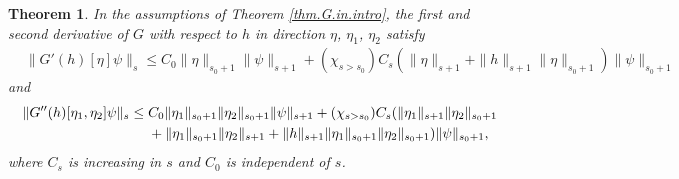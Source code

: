 \documentclass[10pt,reqno,a4paper]{article}
\numberwithin{equation}{section}
\theoremstyle{plain}
\newtheorem{theorem}{Theorem}[section]
\theoremstyle{definition}
\begin{document}
\begin{theorem} \label{thm.der.G.in.intro}
In the assumptions of Theorem \ref{thm.G.in.intro}, 
the first and second derivative of $G$ with respect to $h$ 
in direction $\eta$, $\eta_1$, $\eta_2$ satisfy 
\begin{align} 
& \| G'(h)[\eta] \psi \|_s
\leq C_0 \| \eta \|_{s_0+1} \| \psi \|_{s+1}
+ (\chi_{s > s_0}) C_s (\| \eta \|_{s+1}
+ \| h \|_{s+1} \| \eta \|_{s_0+1}) \| \psi \|_{s_0+1}
\label{echin.63.lin.in.intro}
\end{align}
and 
\begin{align} 
\| G''(h)[\eta_1, \eta_2] \psi \|_{s} 
& \leq C_0 \| \eta_1 \|_{s_0+1} \| \eta_2 \|_{s_0+1} 
\| \psi \|_{s+1} 
+ (\chi_{s > s_0}) C_s ( \| \eta_1 \|_{s+1} \| \eta_2 \|_{s_0+1}
\notag \\ 
& \quad \ 
+ \| \eta_1 \|_{s_0+1} \| \eta_2 \|_{s+1}
+ \| h \|_{s+1} \| \eta_1 \|_{s_0+1} \| \eta_2 \|_{s_0+1} )
\| \psi \|_{s_0+1},
\label{echin.63.second.der.in.intro}
\end{align}
where $C_s$ is increasing in $s$  
and $C_0$ is independent of $s$. 
\end{theorem}
\end{document}
